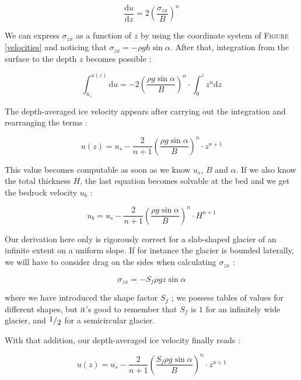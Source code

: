 \begin{equation}\frac{\mathrm{d} u}{\mathrm{d} z} = 2 \left( \frac{\sigma_{zx}}{B}\right)^n\end{equation}

We can express $\sigma_{zx}$ as a function of $z$ by using the coordinate system of \textsc{Figure} \ref{velocities} and noticing that $\sigma_{zx} = -\rho g h \sin{\alpha}$. After that, integration from the surface to the depth $z$ becomes possible :

\begin{equation}\int_{u_s}^{u(z)} \mathrm{d} u = -2 \left( \frac{\rho g \sin{\alpha}}{B}\right)^n \cdot \int_{0}^{z} z^n \mathrm{d} z\end{equation}


The depth-averaged ice velocity appears after carrying out the integration and rearranging the terms :

\begin{equation}u(z) = u_s - \frac{2}{n + 1} \left( \frac{\rho g \sin{\alpha}}{B}\right)^n \cdot z^{n+1}\end{equation}

This value becomes computable as soon as we know $u_s$, $B$ and $\alpha$. If we also know the total thickness $H$, the last equation becomes solvable at the bed and we get the bedrock velocity $u_b$ :

\begin{equation}u_b = u_s - \frac{2}{n + 1} \left( \frac{\rho g \sin{\alpha}}{B}\right)^n \cdot H^{n+1}\end{equation}

Our derivation here only is rigorously correct for a slab-shaped glacier of an infinite extent on a uniform slope. If for instance the glacier is bounded laterally, we will have to consider drag on the sides when calculating $\sigma_{zx}$ :

\begin{equation}\sigma_{zx} = -S_f \rho g z \sin{\alpha}\end{equation}

where we have introduced the shape factor $S_f$ ; we possess tables of values for different shapes, but it's good to remember that $S_f$ is $1$ for an infinitely wide glacier, and $\fraction{1}{2}$ for a semicircular glacier.

With that addition, our depth-averaged ice velocity finally reads :

\begin{equation}
\boxed{u(z) = u_s - \frac{2}{n + 1} \left( \frac{S_f \rho g \sin{\alpha}}{B}\right)^n \cdot z^{n+1}}
\end{equation}



